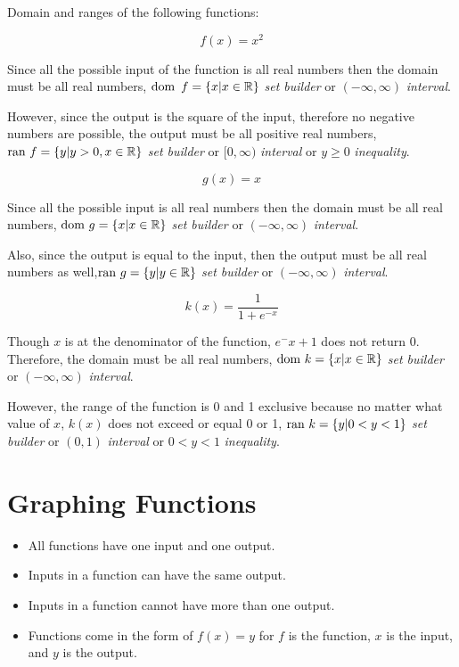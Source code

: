 \begin{ex}
    Domain and ranges of the following functions: 
\end{ex}

{\color{blue}\[
    f(x)=x^2
\]}

Since all the possible input of the function is all real numbers then the domain must be all real numbers, \(\text{dom } \, f = \{x|x \in \mathbb{R}\}\) \emph{set builder} or \((-\infty,\infty)\)  \emph{interval}. 

However, since the output is the square of the input, therefore no negative numbers are possible, the output must be all positive real numbers, \(\text{ran } f = \{y|y>0, x\in\mathbb{R}\}\) \emph{set builder} or \([0,\infty)\) \emph{interval} or \(y \geq 0\) \emph{inequality}.

{\color{blue}\[
    g(x)=x
\]}

Since all the possible input is all real numbers then the domain must be all real numbers, \(\text{dom } g = \{x|x \in \mathbb{R}\}\) \emph{set builder} or \((-\infty,\infty)\)  \emph{interval}. 

Also, since the output is equal to the input, then the output must be all real numbers as well,\(\text{ran } g = \{y|y \in \mathbb{R}\}\) \emph{set builder} or \((-\infty,\infty)\)  \emph{interval}. 

{\color{blue}\[
    k(x)=\frac{1}{1+e^{-x}}
\]}

Though \(x\) is at the denominator of the function, \(e^-x+1\) does not return 0. Therefore, the domain must be all real numbers, \(\text{dom } k = \{x|x \in \mathbb{R}\}\) \emph{set builder} or \((-\infty,\infty)\)  \emph{interval}. 

However, the range of the function is 0 and 1 exclusive because no matter what value of \(x\), \(k(x)\) does not exceed or equal 0 or 1, \(\text{ran } k = \{y | 0 < y < 1\}\) \emph{set builder} or \((0,1)\) \emph{interval} or \(0 < y < 1\) \emph{inequality}.

\section{Graphing Functions}
\begin{tcolorbox}[colback=blue!10!white,colframe=blue!60!black,title=Main Ideas]
    \begin{itemize}
        \item All functions have one input and one output.
        \item Inputs in a function can have the same output.
        \item Inputs in a function cannot have more than one output.
        \item Functions come in the form of \(f(x)=y\) for \(f\) is the function, \(x\) is the input, and \(y\) is the output.
    \end{itemize}
\end{tcolorbox}
